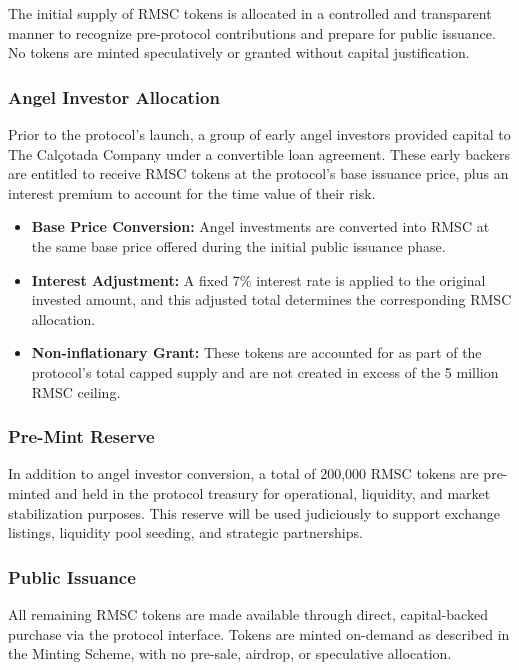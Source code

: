 \documentclass[conference]{IEEEtran}
\begin{document}
The initial supply of RMSC tokens is allocated in a controlled and transparent manner to recognize pre-protocol contributions and prepare for public issuance. No tokens are minted speculatively or granted without capital justification.

\subsubsection{Angel Investor Allocation}

Prior to the protocol's launch, a group of early angel investors provided capital to The Calçotada Company under a convertible loan agreement. These early backers are entitled to receive RMSC tokens at the protocol’s base issuance price, plus an interest premium to account for the time value of their risk.

\begin{itemize}
    \item \textbf{Base Price Conversion:} Angel investments are converted into RMSC at the same base price offered during the initial public issuance phase.
    \item \textbf{Interest Adjustment:} A fixed 7\% interest rate is applied to the original invested amount, and this adjusted total determines the corresponding RMSC allocation.
    \item \textbf{Non-inflationary Grant:} These tokens are accounted for as part of the protocol's total capped supply and are not created in excess of the 5 million RMSC ceiling.
\end{itemize}

\subsubsection{Pre-Mint Reserve}

In addition to angel investor conversion, a total of 200,000 RMSC tokens are pre-minted and held in the protocol treasury for operational, liquidity, and market stabilization purposes. This reserve will be used judiciously to support exchange listings, liquidity pool seeding, and strategic partnerships.

\subsubsection{Public Issuance}

All remaining RMSC tokens are made available through direct, capital-backed purchase via the protocol interface. Tokens are minted on-demand as described in the Minting Scheme, with no pre-sale, airdrop, or speculative allocation.
\end{document}
